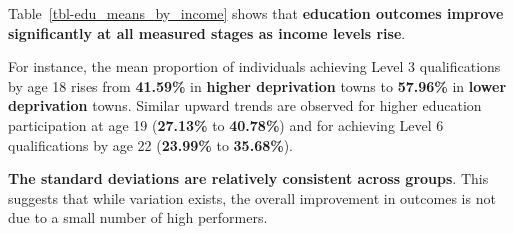 \documentclass[11pt,en]{../resources/elegantpaper}
\begin{document}
Table~\ref{tbl-edu_means_by_income} shows that \textbf{education
outcomes improve significantly at all measured stages as income levels
rise}.

For instance, the mean proportion of individuals achieving Level 3
qualifications by age 18 rises from \textbf{41.59\%} in \textbf{higher
deprivation} towns to \textbf{57.96\%} in \textbf{lower deprivation}
towns. Similar upward trends are observed for higher education
participation at age 19 (\textbf{27.13\%} to \textbf{40.78\%}) and for
achieving Level 6 qualifications by age 22 (\textbf{23.99\%} to
\textbf{35.68\%}).

\textbf{The standard deviations are relatively consistent across
groups}. This suggests that while variation exists, the overall
improvement in outcomes is not due to a small number of high performers.
\end{document}
